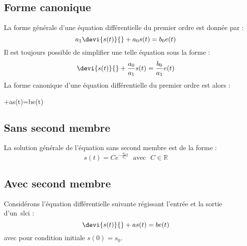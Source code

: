 \subsection{Forme canonique}
La forme générale d'une équation différentielle du premier ordre est
donnée par : 
\[
a_1\devi{s(t)}{}+a_0s(t)=b_0e(t)
\]
Il est toujours possible de simplifier une telle équation sous la forme :
\[
\devi{s(t)}{}+\dfrac{a_0}{a_1}s(t)=\dfrac{b_0}{a_1}e(t)
\]
La forme canonique d'une équation différentielle du premier ordre est alors :
\begin{bequation}
+as(t)=be(t)
\end{bequation}
\subsection{Sans second membre}
La solution générale de l'équation sans second membre est de la forme :
\[
s(t) = C e^{-\frac{a_0}{a_1}t}\,\,\,\,\text{avec}\,\,\,\,C\in\mathbb{R}
\]
\subsection{Avec second membre}
Considérons l'équation différentielle suivante régissant l'entrée
et la sortie d'un~\gls{slci} :
\[
\devi{s(t)}{}+as(t)=be(t)
\]
avec pour condition initiale $s(0)=s_0$.

